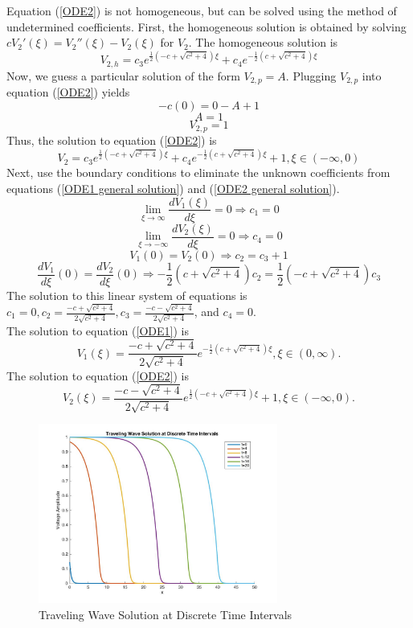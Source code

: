 \documentclass[12pt]{article}
\begin{document}
Equation (\ref{ODE2}) is not homogeneous, but can be solved using the method of undetermined coefficients. First, the homogeneous solution is obtained by solving $cV_2'(\xi)=V_2''(\xi)-V_2(\xi)$ for $V_2$. The homogeneous solution is
$$V_{2,h}=c_3 e^{\frac{1}{2}(-c+\sqrt{c^2+4})\xi}+c_4 e^{-\frac{1}{2}(c+\sqrt{c^2+4})\xi}$$
Now, we guess a particular solution of the form $V_{2,p}=A$. Plugging $V_{2,p}$ into equation (\ref{ODE2}) yields 
$$-c(0)=0-A+1$$
$$A=1$$ 
$$V_{2,p}=1$$
Thus, the solution to equation (\ref{ODE2}) is 
\begin{equation}
\label{ODE2 general solution}
V_{2}=c_3 e^{\frac{1}{2}(-c+\sqrt{c^2+4})\xi}+c_4 e^{-\frac{1}{2}(c+\sqrt{c^2+4})\xi}+1, \xi \in (-\infty,0)
\end{equation}
Next, use the boundary conditions to eliminate the unknown coefficients from equations (\ref{ODE1 general solution}) and (\ref{ODE2 general solution}). 
$$\lim_{\xi\to\infty} \frac{d V_1(\xi)}{d \xi}=0\Rightarrow c_1=0$$
$$\lim_{\xi\to-\infty} \frac{d V_2(\xi)}{d \xi}=0\Rightarrow c_4=0$$
$$V_1(0)=V_2(0)\Rightarrow c_2=c_3+1$$
$$\frac{d V_1}{d \xi}(0)=\frac{d V_2}{d \xi}(0)\Rightarrow -\frac{1}{2}(c+\sqrt{c^2+4}) c_2= \frac{1}{2}(-c+\sqrt{c^2+4})c_3$$ 
The solution to this linear system of equations is $c_1=0, c_2=\frac{-c+\sqrt{c^2+4}}{2\sqrt{c^2+4}}, c_3=\frac{-c-\sqrt{c^2+4}}{2\sqrt{c^2+4}}$, and $c_4=0$.\\
The solution to equation (\ref{ODE1}) is 
\begin{equation}
\label{ODE1 solution}
V_1(\xi)=\frac{-c+\sqrt{c^2+4}}{2\sqrt{c^2+4}}e^{-\frac{1}{2}(c+\sqrt{c^2+4})\xi},\xi \in (0,\infty).
\end{equation}
The solution to equation (\ref{ODE2}) is
\begin{equation}
\label{ODE2 solution}
V_2(\xi)=\frac{-c-\sqrt{c^2+4}}{2\sqrt{c^2+4}}e^{\frac{1}{2}(-c+\sqrt{c^2+4})\xi}+1,\xi \in (-\infty,0).
\end{equation}
\begin{figure}[H]
\centering
\includegraphics[width=0.7\textwidth]{waveThang.jpg}
\caption{Traveling Wave Solution at Discrete Time Intervals}
\label{kahkaw}
\end{figure}
\end{document}
